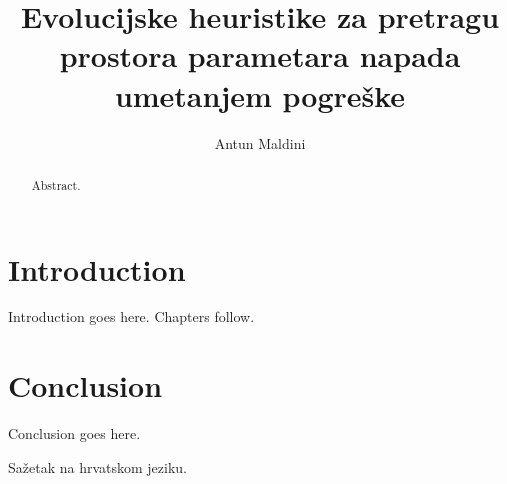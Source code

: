 \documentclass[times, utf8, diplomski]{fer}
\begin{document}

\title{Evolucijske heuristike za pretragu prostora parametara napada umetanjem pogreške}

\author{Antun Maldini}

\maketitle

\izvornik


\tableofcontents

\chapter{Introduction}
Introduction goes here. Chapters follow.

\chapter{Conclusion}
Conclusion goes here.




\begin{sazetak}
Sažetak na hrvatskom jeziku.

\end{sazetak}

\begin{abstract}
Abstract.

\end{abstract}
\end{document}
